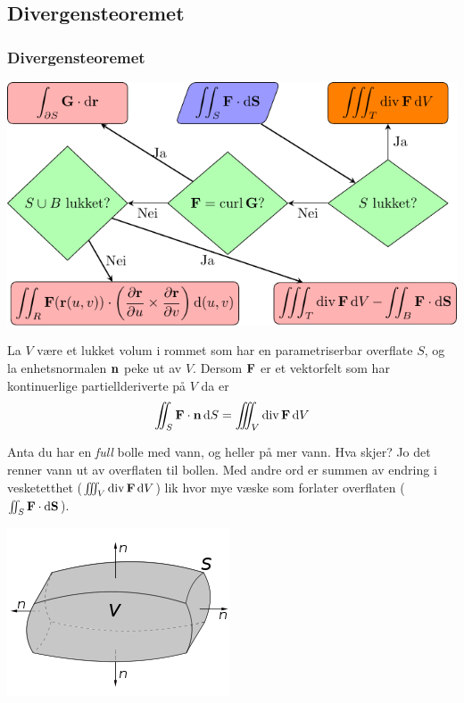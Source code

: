 \begin{frame}
  \subsection{Divergensteoremet}\label{subsec:Divergensteoremet}
  \frametitle{Divergensteoremet}
    \centerline{%
    \includegraphics{../img/flytskjema-overflateintegral-1}
  }
\end{frame}

\begin{frame}
  \begin{theorem}[Divergensteoremet]
    La $V$ være et lukket volum i rommet som har en parametriserbar overflate
    $S$, og la enhetsnormalen $\mathbf{n}$ peke ut av $V$. Dersom $\mathbf{F}$ er et
    vektorfelt som har kontinuerlige partiellderiverte på $V$ da er
    \begin{equation*}
      \iint_S \mathbf{F} \cdot \mathbf{n} \mathop{}\! \mathrm{d} S\mathop{}\! = \iiint_V \operatorname{div} \mathbf{F} \mathop{}\! \mathrm{d} V\mathop{}\!
    \end{equation*}
  \end{theorem}
  \begin{minipage}{.45\textwidth}
    \begin{intuisjon}
      Anta du har en \emph{full} bolle med vann, og heller på mer vann. Hva
      skjer? Jo det renner vann ut av overflaten til bollen. Med andre ord er
      summen av endring i vesketetthet ($\iiint_V \operatorname{div} \mathbf{F} \mathop{}\! \mathrm{d} V\mathop{}\!$) lik
      hvor mye væske som forlater overflaten ($\iint_S \mathbf{F} \cdot \mathop{}\! \mathrm{d} \mathbf{S}\mathop{}\!$).
    \end{intuisjon}
\end{minipage}
\begin{minipage}{.45\textwidth}
  \centering
    \includegraphics[scale=0.75]{../img/bolle2.png}
  \end{minipage}
\end{frame}

